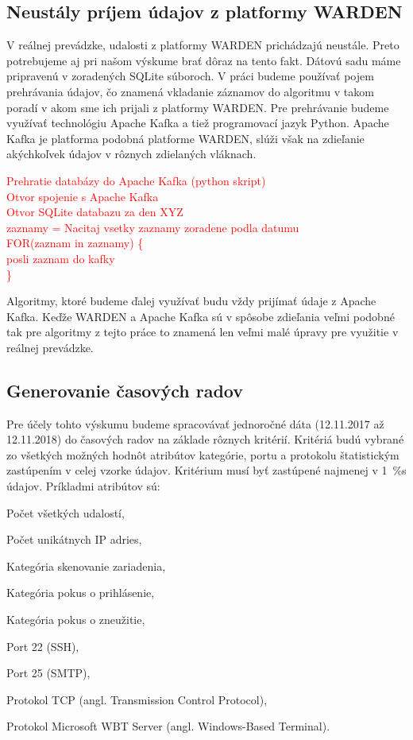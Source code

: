 \documentclass[thesismargins, thesislinespacing, openright, upjsfrontpage, combineabstracts]{rnthesis}
\begin{document}
\subsection{Neustály príjem údajov z platformy WARDEN}

V reálnej prevádzke, udalosti z platformy WARDEN prichádzajú neustále. Preto potrebujeme aj pri našom výskume brať dôraz na tento fakt. Dátovú sadu máme pripravenú v zoradených SQLite súboroch. V práci budeme používať pojem prehrávania údajov, čo znamená vkladanie záznamov do algoritmu v takom poradí v akom sme ich prijali z platformy WARDEN. Pre prehrávanie budeme využívať technológiu Apache Kafka a tiež programovací jazyk Python. Apache Kafka je platforma podobná platforme WARDEN, slúži však na zdieľanie akýchkoľvek údajov v rôznych zdielaných vláknach. 

\textcolor{red}{Prehratie databázy do Apache Kafka (python skript)\\
Otvor spojenie s Apache Kafka\\
Otvor SQLite databazu za den XYZ\\
zaznamy = Nacitaj vsetky zaznamy zoradene podla datumu\\
FOR(zaznam in zaznamy) \{\\
posli zaznam do kafky\\
\}}

Algoritmy, ktoré budeme ďalej využívať budu vždy prijímať údaje z Apache Kafka. Keďže WARDEN a Apache Kafka sú v spôsobe zdieľania veľmi podobné tak pre algoritmy z tejto práce to znamená len veľmi malé úpravy pre využitie v reálnej prevádzke.

\subsection{Generovanie časových radov}

Pre účely tohto výskumu budeme spracovávať jednoročné dáta (12.11.2017 až 12.11.2018) do časových radov na základe rôznych kritérií. Kritériá budú vybrané zo všetkých možných hodnôt atribútov kategórie, portu a protokolu štatistickým zastúpením v celej vzorke údajov. Kritérium musí byť zastúpené najmenej v 1~\%s údajov. Príkladmi atribútov sú: 
\begin{compactenum}
    \item Počet všetkých udalostí,
    \item Počet unikátnych IP adries,
    \item Kategória skenovanie zariadenia,
    \item Kategória pokus o prihlásenie,
    \item Kategória pokus o zneužitie,
    \item Port 22 (SSH),
    \item Port 25 (SMTP),
    \item Protokol TCP (angl. Transmission Control Protocol),
    \item Protokol Microsoft WBT Server (angl. Windows-Based Terminal).
\end{compactenum}
\end{document}
